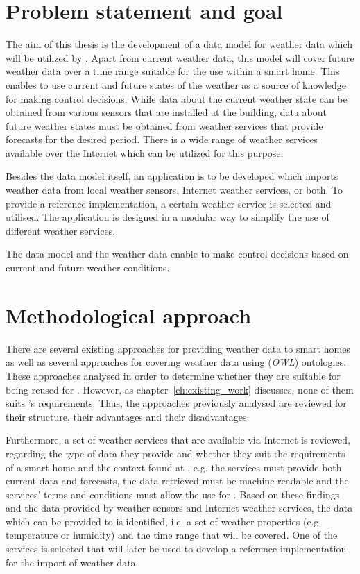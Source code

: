 \section{Problem statement and goal}


The aim of this thesis is the development of a data model for weather data which will be utilized by \thinkhome. Apart from current weather data, this model will cover future weather data over a time range suitable for the use within a smart home. This enables \thinkhome to use current and future states of the weather as a source of knowledge for making control decisions. While data about the current weather state can be obtained from various sensors that are installed at the building, data about future weather states must be obtained from weather services that provide forecasts for the desired period. There is a wide range of weather services available over the Internet which can be utilized for this purpose.

Besides the data model itself, an application is to be developed which imports weather data from local weather sensors, Internet weather services, or both. To provide a reference implementation, a certain weather service is selected and utilised. The application is designed in a modular way to simplify the use of different weather services.

The data model and the weather data enable \thinkhome to make control decisions based on current and future weather conditions.

\section{Methodological approach}

There are several existing approaches for providing weather data to smart homes as well as several approaches for covering weather data using (\emph{OWL}) ontologies. These approaches analysed in order to determine whether they are suitable for being reused for \thinkhome. However, as chapter~\ref{ch:existing_work} discusses, none of them suits \thinkhome's requirements. Thus, the approaches previously analysed are reviewed for their structure, their advantages and their disadvantages.

Furthermore, a set of weather services that are available via Internet is reviewed, regarding the type of data they provide and whether they suit the requirements of a smart home and the context found at \thinkhome, e.g. the services must provide both current data and forecasts, the data retrieved must be machine-readable and the services' terms and conditions must allow the use for \thinkhome. Based on these findings and the data provided by weather sensors and Internet weather services, the data which can be provided to \thinkhome is identified, i.e. a set of weather properties (e.g. temperature or humidity) and the time range that will be covered. One of the services is selected that will later be used to develop a reference implementation for the import of weather data.

